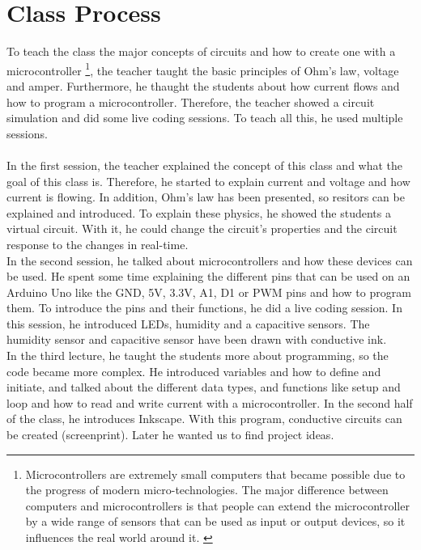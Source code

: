 \documentclass[00_doc.tex]{subfiles}
\begin{document}
    \section{Class Process}
    \begin{flushleft}
        To teach the class the major concepts of circuits and how to create one with a 
        microcontroller {\footnote{\label{foot: microcontroller} Microcontrollers are 
        extremely small computers that became possible due to the progress of modern 
        micro-technologies. The major difference between computers and microcontrollers 
        is that people can extend the microcontroller by a wide range of sensors that 
        can be used as input or output devices, so it influences the real world around 
        it. \cite{Schief1997, Dembowski2014}}}, the teacher taught the basic principles 
        of Ohm's law, voltage and amper. Furthermore, he thaught the students about how 
        current flows and how to program a microcontroller. Therefore, the teacher 
        showed a circuit simulation and did some live coding sessions. To teach 
        all this, he used multiple sessions.\\~\\

        In the first session, the teacher explained the concept of this class and what 
        the goal of this class is. Therefore, he started to explain current and voltage
        and how current is flowing. In addition, Ohm's law has been presented, so resitors 
        can be explained and introduced. To explain these physics, he showed the students 
        a virtual circuit. With it, he could change the circuit's properties and the 
        circuit response to the changes in real-time.\cite{Wegener2020}\\

        In the second session, he talked about microcontrollers and how these devices can 
        be used. He spent some time explaining the different pins that can be used on an
        Arduino Uno \cite{arduinoUno} like the GND, 5V, 3.3V, A1, D1 or PWM pins and how 
        to program them. To introduce the pins and their functions, he did a live coding 
        session. In this session, he introduced LEDs, humidity and a 
        capacitive sensors. The humidity sensor and capacitive sensor have been drawn with 
        conductive ink.\\

        In the third lecture, he taught the students more about programming, so the code 
        became more complex. He introduced variables and how to define and initiate, and 
        talked about the different data types, and functions like setup and loop and how 
        to read and write current with a microcontroller. In the second half of the class, 
        he introduces Inkscape\cite{inkscape}. With this program, conductive circuits can 
        be created (screenprint). Later he wanted us to find project ideas.\\


\end{flushleft}
\end{document}
